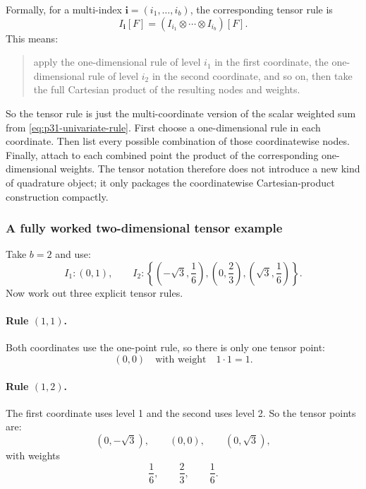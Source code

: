 \documentclass[11pt]{article}
\numberwithin{equation}{section}
\begin{document}
Formally, for a multi-index \(\mathbf i=(i_1,\ldots,i_b)\), the corresponding
tensor rule is
\begin{equation}
  I_{\mathbf i}[F]
  =
  (I_{i_1}\otimes\cdots\otimes I_{i_b})[F].
  \label{eq:p31-tensor-rule}
\end{equation}
This means:
\begin{quote}
apply the one-dimensional rule of level \(i_1\) in the first coordinate, the
one-dimensional rule of level \(i_2\) in the second coordinate, and so on, then
take the full Cartesian product of the resulting nodes and weights.
\end{quote}
So the tensor rule is just the multi-coordinate version of the scalar weighted
sum from \eqref{eq:p31-univariate-rule}.  First choose a one-dimensional rule in
each coordinate.  Then list every possible combination of those coordinatewise
nodes.  Finally, attach to each combined point the product of the corresponding
one-dimensional weights.  The tensor notation therefore does not introduce a new
kind of quadrature object; it only packages the coordinatewise Cartesian-product
construction compactly.

\subsubsection{A fully worked two-dimensional tensor example}

Take \(b=2\) and use:
\begin{equation}
  I_1:(0,1),
  \qquad
  I_2:\left\{\left(-\sqrt3,\frac16\right),\left(0,\frac23\right),
  \left(\sqrt3,\frac16\right)\right\}.
  \label{eq:p36-level1-level2-rules}
\end{equation}
Now work out three explicit tensor rules.

\paragraph{Rule \texorpdfstring{\((1,1)\)}{(1,1)}.}
Both coordinates use the one-point rule, so there is only one tensor point:
\begin{equation}
  (0,0)
  \quad\text{with weight}\quad 1\cdot 1 = 1.
  \label{eq:p36-rule-11}
\end{equation}

\paragraph{Rule \texorpdfstring{\((1,2)\)}{(1,2)}.}
The first coordinate uses level 1 and the second uses level 2.  So the tensor
points are:
\begin{equation}
  (0,-\sqrt3),\qquad (0,0),\qquad (0,\sqrt3),
  \label{eq:p36-rule-12-points}
\end{equation}
with weights
\begin{equation}
  \frac16,\qquad \frac23,\qquad \frac16.
  \label{eq:p36-rule-12-weights}
\end{equation}
\end{document}
